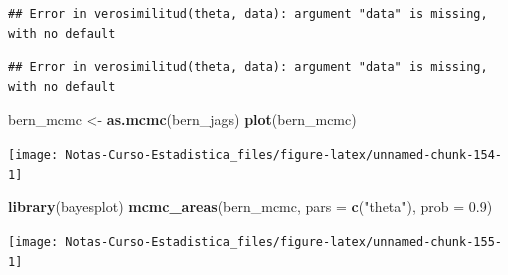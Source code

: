 \documentclass[
  12pt,
]{book}
\newenvironment{Shaded}{\begin{snugshade}}{\end{snugshade}}
\newcommand{\DataTypeTok}[1]{\textcolor[rgb]{0.13,0.29,0.53}{#1}}
\newcommand{\DecValTok}[1]{\textcolor[rgb]{0.00,0.00,0.81}{#1}}
\newcommand{\FloatTok}[1]{\textcolor[rgb]{0.00,0.00,0.81}{#1}}
\newcommand{\KeywordTok}[1]{\textcolor[rgb]{0.13,0.29,0.53}{\textbf{#1}}}
\newcommand{\NormalTok}[1]{#1}
\newcommand{\OperatorTok}[1]{\textcolor[rgb]{0.81,0.36,0.00}{\textbf{#1}}}
\newcommand{\StringTok}[1]{\textcolor[rgb]{0.31,0.60,0.02}{#1}}
\theoremstyle{definition}
\theoremstyle{definition}
\theoremstyle{definition}
\theoremstyle{remark}
\begin{document}
\begin{verbatim}
## Error in verosimilitud(theta, data): argument "data" is missing, with no default
\end{verbatim}

\begin{Shaded}
\end{Shaded}

\begin{verbatim}
## Error in verosimilitud(theta, data): argument "data" is missing, with no default
\end{verbatim}

\begin{Shaded}
\begin{Highlighting}[]
\NormalTok{bern_mcmc <-}\StringTok{ }\KeywordTok{as.mcmc}\NormalTok{(bern_jags)}
\KeywordTok{plot}\NormalTok{(bern_mcmc)}
\end{Highlighting}
\end{Shaded}

\begin{center}\texttt{[image: Notas-Curso-Estadistica\_files/figure-latex/unnamed-chunk-154-1]} \end{center}

\begin{Shaded}
\begin{Highlighting}[]
\KeywordTok{library}\NormalTok{(bayesplot)}
\KeywordTok{mcmc_areas}\NormalTok{(bern_mcmc, }\DataTypeTok{pars =} \KeywordTok{c}\NormalTok{(}\StringTok{"theta"}\NormalTok{), }\DataTypeTok{prob =} \FloatTok{0.9}\NormalTok{)}
\end{Highlighting}
\end{Shaded}

\begin{center}\texttt{[image: Notas-Curso-Estadistica\_files/figure-latex/unnamed-chunk-155-1]} \end{center}
\end{document}
